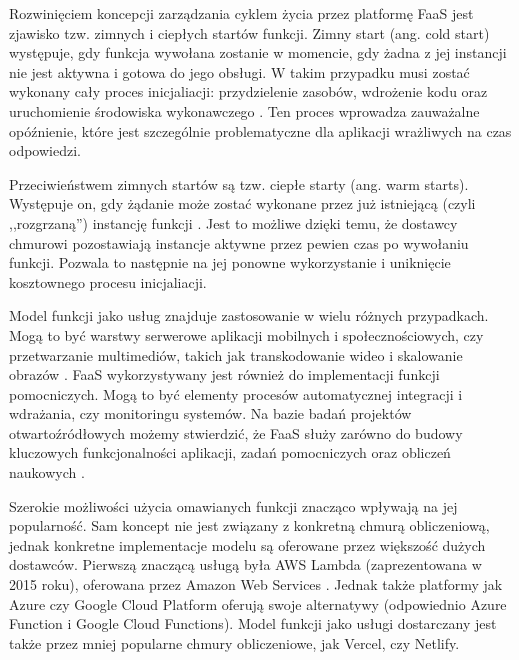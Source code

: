 Rozwinięciem koncepcji zarządzania cyklem życia przez platformę FaaS jest zjawisko tzw. zimnych i ciepłych startów funkcji.
Zimny start (ang. cold start) występuje, gdy funkcja wywołana zostanie w momencie, gdy żadna z jej instancji nie jest aktywna i gotowa do jego obsługi.
W takim przypadku musi zostać wykonany cały proces inicjaliacji: przydzielenie zasobów, wdrożenie kodu oraz uruchomienie środowiska wykonawczego \cite{SpecRgCloudGroupVisionOnThePerformanceChallengesOfFaas}.
Ten proces wprowadza zauważalne opóźnienie, które jest szczególnie problematyczne dla aplikacji wrażliwych na czas odpowiedzi.

Przeciwieństwem zimnych startów są tzw. ciepłe starty (ang. warm starts).
Występuje on, gdy żądanie może zostać wykonane przez już istniejącą (czyli ,,rozgrzaną'') instancję funkcji \cite{SpecRgCloudGroupVisionOnThePerformanceChallengesOfFaas}.
Jest to możliwe dzięki temu, że dostawcy chmurowi pozostawiają instancje aktywne przez pewien czas po wywołaniu funkcji.
Pozwala to następnie na jej ponowne wykorzystanie i uniknięcie kosztownego procesu inicjaliacji.

Model funkcji jako usług znajduje zastosowanie w wielu różnych przypadkach.
Mogą to być warstwy serwerowe aplikacji mobilnych i społecznościowych, czy przetwarzanie multimediów, takich jak transkodowanie wideo i skalowanie obrazów \cite{ServerlessApplicationsWhyWhenAndHow}.
FaaS wykorzystywany jest również do implementacji funkcji pomocniczych.
Mogą to być elementy procesów automatycznej integracji i wdrażania, czy monitoringu systemów. 
Na bazie badań projektów otwartoźródłowych możemy stwierdzić, że FaaS służy zarówno do budowy kluczowych funkcjonalności aplikacji, zadań pomocniczych oraz obliczeń naukowych \cite{ServerlessApplicationsWhyWhenAndHow}.

Szerokie możliwości użycia omawianych funkcji znacząco wpływają na jej popularność. 
Sam koncept nie jest związany z konkretną chmurą obliczeniową, jednak konkretne implementacje modelu są oferowane przez większość dużych dostawców.
Pierwszą znaczącą usługą była AWS Lambda (zaprezentowana w 2015 roku), oferowana przez Amazon Web Services \cite{Ekwe_Ekwe_2024}.
Jednak także platformy jak Azure czy Google Cloud Platform oferują swoje alternatywy (odpowiednio Azure Function i Google Cloud Functions).
Model funkcji jako usługi dostarczany jest także przez mniej popularne chmury obliczeniowe, jak Vercel, czy Netlify.
